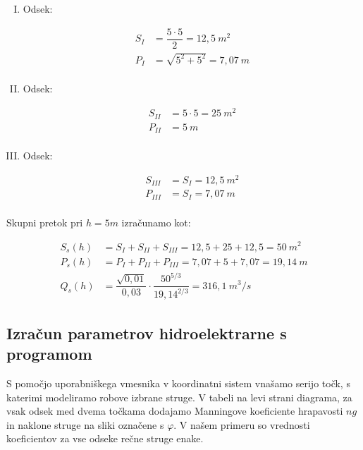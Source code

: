 \begin{enumerate}[I.]
	
	\item Odsek:
	
	\begin{ceqn}
		\begin{align}
		S_I&=\dfrac{5 \cdot 5}{2} = 12,5~m^2\\
		P_I&=\sqrt{5^2 + 5^2} = 7,07~m\\
		\end{align}
	\end{ceqn}
	
	\item Odsek:
	
	\begin{ceqn}
		\begin{align}
		S_{II}&=5\cdot5 = 25 ~m^2\\
		P_{II}&=5~m\\
		\end{align}
	\end{ceqn}
	
	\item Odsek:
	\begin{ceqn}
		\begin{align}
		S_{III}&=S_{I} = 12,5~m^2\\
		P_{III}&=S_{I} = 7,07~m\\
		\end{align}
	\end{ceqn}
	
\end{enumerate}

Skupni pretok pri $h=5m$ izračunamo kot:

\begin{ceqn}
	\begin{align}
	S_s(h) &= S_{I} + S_{II} + S_{III} = 12,5 + 25 + 12,5 = 50~m^2\\
	P_s(h) &= P_{I} + P_{II} + P_{III} = 7,07 + 5 + 7,07 = 19,14~m\\
	Q_s(h)&= \dfrac{\sqrt{0,01}}{0,03} \cdot \dfrac{50^{5/3}}{19,14^{2/3}} = 316,1~m^3/s
	\end{align}
\end{ceqn}




\subsection{Izračun parametrov hidroelektrarne s programom}

S pomočjo uporabniškega vmesnika v koordinatni sistem vnašamo serijo točk, s katerimi modeliramo robove izbrane struge. V tabeli na levi strani diagrama, za vsak odsek med dvema točkama dodajamo Manningove koeficiente hrapavosti $ng$ in naklone struge na sliki označene s $\varphi$. V našem primeru so vrednosti koeficientov za vse odseke rečne struge enake.

